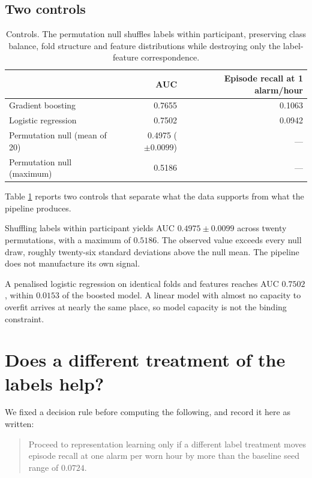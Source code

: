 \documentclass{article}
\begin{document}
\subsection{Two controls}

\begin{table}[t]
\caption{Controls. The permutation null shuffles labels within participant,
preserving class balance, fold structure and feature distributions while
destroying only the label-feature correspondence.}
\label{tab:controls}
\centering
\begin{tabular}{lrr}
\toprule
 & AUC & Episode recall at 1 alarm/hour \\
\midrule
Gradient boosting        & 0.7655 & 0.1063 \\
Logistic regression      & 0.7502 & 0.0942 \\
\midrule
Permutation null (mean of 20) & 0.4975 ($\pm 0.0099$) & --- \\
Permutation null (maximum)    & 0.5186 & --- \\
\bottomrule
\end{tabular}
\end{table}

Table \ref{tab:controls} reports two controls that separate what the data
supports from what the pipeline produces.

Shuffling labels within participant yields AUC $0.4975 \pm 0.0099$ across
twenty permutations, with a maximum of $0.5186$. The observed value exceeds
every null draw, roughly twenty-six standard deviations above the null mean.
The pipeline does not manufacture its own signal.

A penalised logistic regression on identical folds and features reaches AUC
$0.7502$, within $0.0153$ of the boosted model. A linear model with almost no
capacity to overfit arrives at nearly the same place, so model capacity is not
the binding constraint.

\section{Does a different treatment of the labels help?}
\label{sec:pu}

We fixed a decision rule before computing the following, and record it here as
written:

\begin{quote}
Proceed to representation learning only if a different label treatment moves
episode recall at one alarm per worn hour by more than the baseline seed range
of $0.0724$.
\end{quote}
\end{document}

